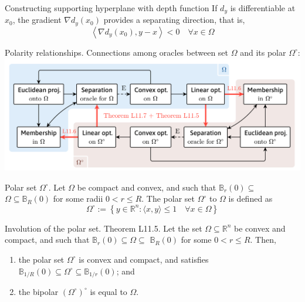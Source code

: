\begin{theorem}[L11.4]{Constructing supporting hyperplane with depth function}
    If $d_y$ is differentiable at $x_0$, the gradient $\nabla d_y\left(x_0\right)$ provides a separating direction, that is,
    \vspace{-4pt}\\
    $$
    \left\langle\nabla d_y\left(x_0\right), y-x\right\rangle<0 \quad \forall x \in \Omega
    $$
    \vspace{-4pt}
\end{theorem}

\begin{remark}[L11.3]{Polarity relationships.}
    Connections among oracles between set $\Omega$ and its polar $\Omega^{\circ}$:
    \includegraphics[width=\columnwidth]{figures/polarity.png}
\end{remark}

\begin{definition}[L11.1]{Polar set $\Omega^\circ$.}
    Let $\Omega$ be compact and convex, and such that $\mathbb{B}_r(0) \subseteq$ $\Omega \subseteq \mathbb{B}_R(0)$ for some radii $0<r \leq R$. The polar set $\Omega^{\circ}$ to $\Omega$ is defined as
    \vspace{-4pt}\\
    $$
    \Omega^{\circ}:=\left\{y \in \mathbb{R}^n:\langle x, y\rangle \leq 1 \quad \forall x \in \Omega\right\}
    $$
    \vspace{-4pt}
\end{definition}

\begin{theorem}[L11.5]{Involution of the polar set.}
    Theorem L11.5. Let the set $\Omega \subseteq \mathbb{R}^n$ be convex and compact, and such that $\mathbb{B}_r(0) \subseteq \Omega \subseteq$ $\mathbb{B}_R(0)$ for some $0<r \leq R$. Then,
    \begin{enumerate}[leftmargin=*]
        \item the polar set $\Omega^{\circ}$ is convex and compact, and satisfies $\mathbb{B}_{1 / R}(0) \subseteq \Omega^{\circ} \subseteq \mathbb{B}_{1 / r}(0)$; and
        \item the bipolar $\left(\Omega^{\circ}\right)^{\circ}$ is equal to $\Omega$.
    \end{enumerate}
\end{theorem}

